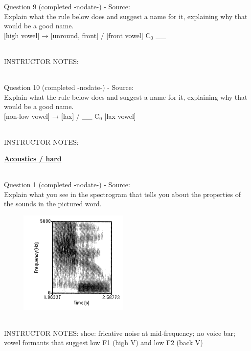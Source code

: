 \documentclass[12pt]{article}
\begin{document}
{\large Question 9} (completed -nodate-) - Source: \\

Explain what the rule below does and suggest a name for it, explaining why that would be a good name.\\

{[high vowel]} →  {[unround, front]} / {[front vowel]} C$_0$ \_\_


~\\
INSTRUCTOR NOTES: 


~\\

{\large Question 10} (completed -nodate-) - Source: \\

Explain what the rule below does and suggest a name for it, explaining why that would be a good name.\\

{[non-low vowel]} →  {[lax]} / \_\_ C$_0$ {[lax vowel]}


~\\
INSTRUCTOR NOTES: 


\newpage\textbf{\underline{\huge Acoustics / hard\\}}

~\\

{\large Question 1} (completed -nodate-) - Source: \\

Explain what you see in the spectrogram that tells you about the properties of the sounds in the pictured word.\\

\begin{figure}[H]
\includegraphics{../images/spectrogram_shoe.png}
\end{figure}

~\\
INSTRUCTOR NOTES: shoe: fricative noise at mid-frequency; no voice bar; vowel formants that suggest low F1 (high V) and low F2 (back V)
\end{document}
